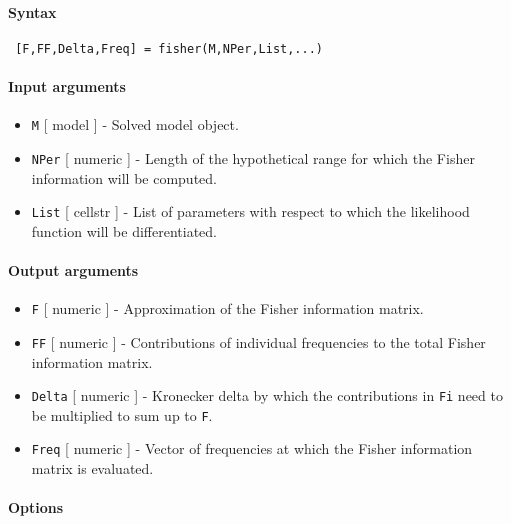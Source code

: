 


	\paragraph{Syntax}
 
 \begin{verbatim}
 [F,FF,Delta,Freq] = fisher(M,NPer,List,...)
 \end{verbatim}
 
 \paragraph{Input arguments}
 
 \begin{itemize}
 \item
   \texttt{M} {[} model {]} - Solved model object.
 \item
   \texttt{NPer} {[} numeric {]} - Length of the hypothetical range for
   which the Fisher information will be computed.
 \item
   \texttt{List} {[} cellstr {]} - List of parameters with respect to
   which the likelihood function will be differentiated.
 \end{itemize}
 
 \paragraph{Output arguments}
 
 \begin{itemize}
 \item
   \texttt{F} {[} numeric {]} - Approximation of the Fisher information
   matrix.
 \item
   \texttt{FF} {[} numeric {]} - Contributions of individual frequencies
   to the total Fisher information matrix.
 \item
   \texttt{Delta} {[} numeric {]} - Kronecker delta by which the
   contributions in \texttt{Fi} need to be multiplied to sum up to
   \texttt{F}.
 \item
   \texttt{Freq} {[} numeric {]} - Vector of frequencies at which the
   Fisher information matrix is evaluated.
 \end{itemize}
 
 \paragraph{Options}
 
